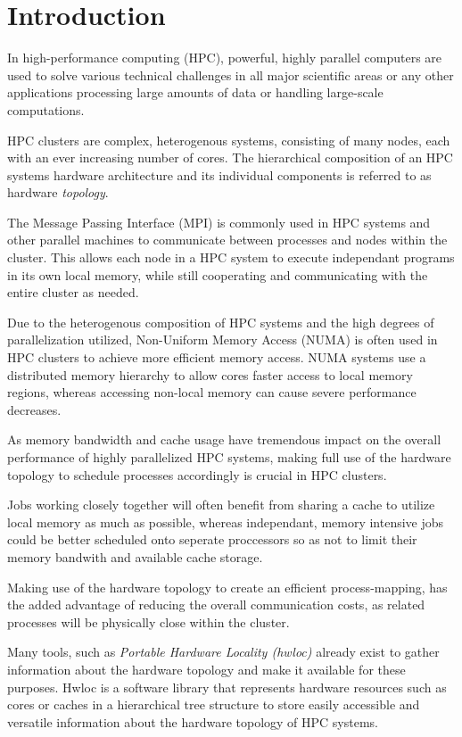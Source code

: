 \chapter{Introduction}\label{chapter:introduction}
In high-performance computing (HPC), powerful, highly parallel computers are used to solve various technical challenges in all major scientific areas or any other applications processing
large amounts of data or handling large-scale computations. \cite{hpc_intro}

HPC clusters are complex, heterogenous systems, consisting of many nodes, each with an ever increasing number of cores.
The hierarchical composition of an HPC systems hardware architecture and its individual components is referred to as hardware \emph{topology}. \cite{topology_intro}

The Message Passing Interface (MPI) is commonly used in HPC systems and other parallel machines to communicate between processes and nodes within the cluster.
This allows each node in a HPC system to execute independant programs in its own local memory, while still cooperating and communicating with the entire cluster as needed. \cite{mpi_intro}

Due to the heterogenous composition of HPC systems and the high degrees of parallelization utilized,
Non-Uniform Memory Access (NUMA) is often used in HPC clusters to achieve more efficient memory access.
NUMA systems use a distributed memory hierarchy to allow cores faster access to local memory regions, whereas accessing non-local memory can cause severe performance decreases. \cite{nuioa_intro}

As memory bandwidth and cache usage have tremendous impact on the overall performance of highly parallelized HPC systems,
making full use of the hardware topology to schedule processes accordingly is crucial in HPC clusters. \cite{openmp_intro}

Jobs working closely together will often benefit from sharing a cache to utilize local memory as much as possible,
whereas independant, memory intensive jobs could be better scheduled onto seperate proccessors so as not to limit their memory bandwith and available cache storage. \cite{hwloc_paper}

Making use of the hardware topology to create an efficient process-mapping, has the added advantage of reducing the overall communication costs, as related processes will be physically close within the cluster. \cite{topology_intro}

Many tools, such as \emph{Portable Hardware Locality (hwloc)} \cite{hwloc} already exist to gather information about the hardware topology and make it available for these purposes.
Hwloc is a software library that represents hardware resources such as cores or caches in a hierarchical tree structure
to store easily accessible and versatile information about the hardware topology of HPC systems. \cite{hwloc_paper}

